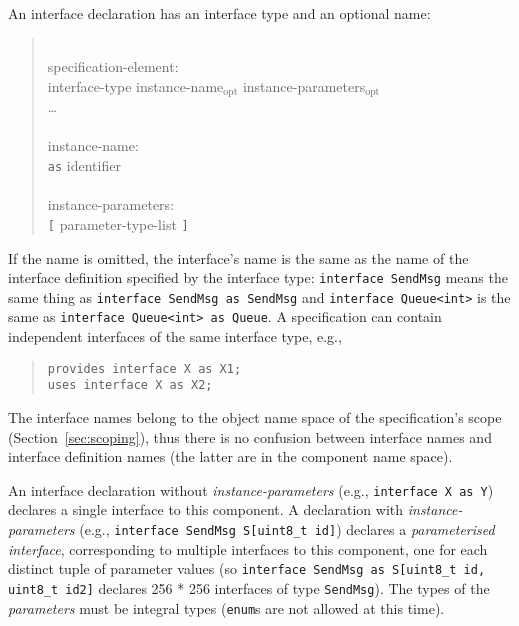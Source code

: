 \documentclass[11pt,letterpaper]{article}
\newcommand{\kw}[1]{{\tt #1}}
\newcommand{\code}[1]{{\tt #1}}
\newcommand{\opt}{$_{\mbox{opt}}$\xspace}
\newcommand{\grammarshift}{\vspace*{-.7cm}}
\newcommand{\grammarindent}{\hspace*{2cm}\= \\ \kill}
\begin{document}
An interface declaration has an interface type and an optional name:
\begin{quote} \grammarshift \em \begin{tabbing}
\grammarindent
specification-element:\\
\>	interface-type instance-name\opt instance-parameters\opt\\
\>	\ldots\\
\\
instance-name:\\
\>	\kw{as} identifier\\
\\
instance-parameters:\\
\>	\kw{[} parameter-type-list \kw{]}
\end{tabbing} \end{quote}
If the name is omitted, the interface's name is the same as the name of the
interface definition specified by the interface type: \code{interface
SendMsg} means the same thing as \code{interface SendMsg as SendMsg} and
\code{interface Queue<int>} is the same as \code{interface Queue<int> as
Queue}. A specification can contain independent interfaces of the
same interface type, e.g., 
\begin{quote}
\begin{verbatim}
provides interface X as X1; 
uses interface X as X2;
\end{verbatim}
\end{quote}
The interface names belong to the object name space of the specification's
scope (Section~\ref{sec:scoping}), thus there is no confusion between
interface names and interface definition names (the latter are in the
component name space).

An interface declaration without \emph{instance-parameters} (e.g.,
\code{interface X as Y}) declares a single interface to this
component. A declaration with \emph{instance-parameters} (e.g.,
\code{interface SendMsg S[uint8\_t id]}) declares a \emph{parameterised
interface}, corresponding to multiple interfaces to this component, one for
each distinct tuple of parameter values (so \code{interface SendMsg as
S[uint8\_t id, uint8\_t id2]} declares 256 * 256 interfaces of type
\code{SendMsg}). The types of the \emph{parameters} must be integral types
(\kw{enum}s are not allowed at this time).
\end{document}
